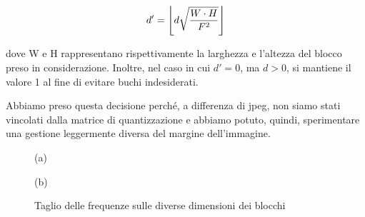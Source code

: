 $$d' = \floor*{d  \sqrt{ \frac{W \cdot H}{F^{2}}}}$$

dove W e H rappresentano rispettivamente la larghezza e l'altezza del blocco preso in considerazione.
Inoltre, nel caso in cui $d'=0$, ma $d>0$, si mantiene il valore 1 al fine di evitare buchi indesiderati.

Abbiamo preso questa decisione perché, a differenza di jpeg, non siamo stati vincolati dalla matrice di quantizzazione e abbiamo potuto, quindi, sperimentare una gestione leggermente diversa del margine dell'immagine.


\begin{figure}
	\begin{minipage}{0.5\textwidth}
		\begin{center}
		
		\end{center}
		\begin{center}
			(a)
		\end{center}
	\end{minipage}\hfill
	\begin{minipage}{0.5\textwidth}
		\begin{center}
		\end{center}
	\begin{center}
		(b)
	\end{center}
\end{minipage}
\caption{Taglio delle frequenze sulle diverse dimensioni dei blocchi}\label{fig:taglio}
\end{figure}

